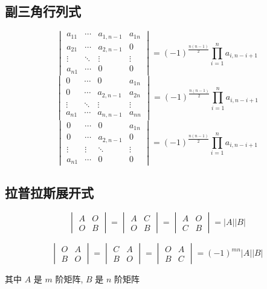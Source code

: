 \subsection{副三角行列式}

\begin{corollary}[副三角行列式]
	$$\begin{vmatrix}
		a_{11} & \cdots & a_{1,n-1} & a_{1n}\\
		a_{21} & \cdots & a_{2,n-1} & 0\\
		\vdots & \ddots & \vdots    & \vdots\\
		a_{n1} & \cdots & 0         & 0
	\end{vmatrix} = (-1)^{\frac{n(n-1)}{2}} \prod\limits_{i = 1}^{n} a_{i,n-i+1}$$
	$$\begin{vmatrix}
		0      & \cdots & 0         & a_{1n}\\
		0      & \cdots & a_{2,n-1} & a_{2n}\\
		\vdots & \ddots & \vdots    & \vdots\\
		a_{n1} & \cdots & a_{n,n-1} & a_{nn}
	\end{vmatrix} = (-1)^{\frac{n(n-1)}{2}} \prod\limits_{i = 1}^{n} a_{i,n-i+1}$$
	$$\begin{vmatrix}
		0      & \cdots & 0          & a_{1n}\\
		0      & \cdots & a_{2,n-1}  & 0\\
		\vdots & \vdots & \ddots     & \vdots\\
		a_{n1} & \cdots & 0          & 0
	\end{vmatrix} = (-1)^{\frac{n(n-1)}{2}} \prod\limits_{i = 1}^{n} a_{i,n-i+1}$$
\end{corollary}
\subsection{拉普拉斯展开式}
\begin{corollary}[拉普拉斯展开式]
	$$\begin{vmatrix}
		A & O\\
		O & B
	\end{vmatrix} =  
	\begin{vmatrix}
		A & C\\
		O & B
	\end{vmatrix} =  
	\begin{vmatrix}
		A & O\\
		C & B
	\end{vmatrix} = \big|A\big|\big|B\big|$$

	$$\begin{vmatrix}
		O & A\\
		B & O
	\end{vmatrix} = 
	\begin{vmatrix}
		C & A\\
		B & O
	\end{vmatrix} =  
	\begin{vmatrix}
		O & A\\
		B & C
	\end{vmatrix} = (-1)^{mn}\big|A\big|\big|B\big|$$

	其中 $A$ 是 $m$ 阶矩阵, $B$ 是 $n$ 阶矩阵
\end{corollary}
